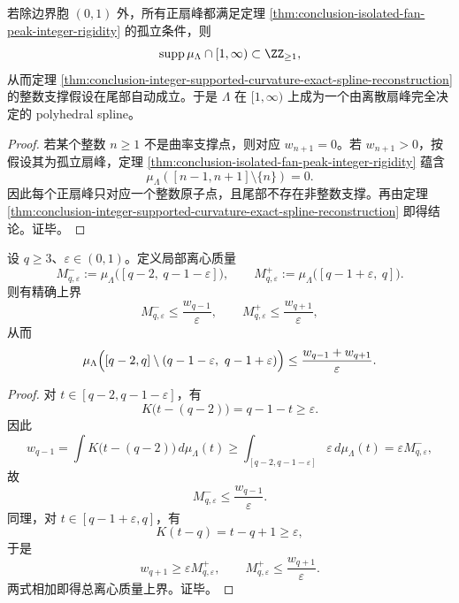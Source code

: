 \begin{corollary}\label{cor:conclusion-isolated-peak-family-global-polyhedral-spline-closure}
若除边界胞 \((0,1)\) 外，所有正扇峰都满足定理 \ref{thm:conclusion-isolated-fan-peak-integer-rigidity} 的孤立条件，则
\[
\operatorname{supp}\mu_\Lambda\cap[1,\infty)\subset \ZZ_{\ge 1},
\]
从而定理 \ref{thm:conclusion-integer-supported-curvature-exact-spline-reconstruction} 的整数支撑假设在尾部自动成立。于是 \(\Lambda\) 在 \([1,\infty)\) 上成为一个由离散扇峰完全决定的 polyhedral spline。
\end{corollary}
\begin{proof}
若某个整数 \(n\ge 1\) 不是曲率支撑点，则对应 \(w_{n+1}=0\)。若 \(w_{n+1}>0\)，按假设其为孤立扇峰，定理 \ref{thm:conclusion-isolated-fan-peak-integer-rigidity} 蕴含
\[
\mu_\Lambda([n-1,n+1]\setminus\{n\})=0.
\]
因此每个正扇峰只对应一个整数原子点，且尾部不存在非整数支撑。再由定理 \ref{thm:conclusion-integer-supported-curvature-exact-spline-reconstruction} 即得结论。证毕。
\end{proof}

\begin{theorem}[近孤立扇峰的定量局部化]\label{thm:conclusion-near-isolated-fan-peak-quantitative-localization}
设 \(q\ge 3\)、\(\varepsilon\in(0,1)\)。定义局部离心质量
\[
M^-_{q,\varepsilon}:=
\mu_\Lambda\bigl([q-2,\ q-1-\varepsilon]\bigr),
\qquad
M^+_{q,\varepsilon}:=
\mu_\Lambda\bigl([q-1+\varepsilon,\ q]\bigr).
\]
则有精确上界
\[
M^-_{q,\varepsilon}\le \frac{w_{q-1}}{\varepsilon},
\qquad
M^+_{q,\varepsilon}\le \frac{w_{q+1}}{\varepsilon},
\]
从而
\[
\mu_\Lambda\Bigl([q-2,q]\setminus(q-1-\varepsilon,\ q-1+\varepsilon)\Bigr)
\le
\frac{w_{q-1}+w_{q+1}}{\varepsilon}.
\]
\end{theorem}
\begin{proof}
对 \(t\in[q-2,q-1-\varepsilon]\)，有
\[
K\bigl(t-(q-2)\bigr)=q-1-t\ge \varepsilon.
\]
因此
\[
w_{q-1}
=
\int K\bigl(t-(q-2)\bigr)\,d\mu_\Lambda(t)
\ge
\int_{[q-2,q-1-\varepsilon]}\varepsilon\,d\mu_\Lambda(t)
=
\varepsilon M^-_{q,\varepsilon},
\]
故
\[
M^-_{q,\varepsilon}\le \frac{w_{q-1}}{\varepsilon}.
\]
同理，对 \(t\in[q-1+\varepsilon,q]\)，有
\[
K(t-q)=t-q+1\ge \varepsilon,
\]
于是
\[
w_{q+1}\ge \varepsilon M^+_{q,\varepsilon},
\qquad
M^+_{q,\varepsilon}\le \frac{w_{q+1}}{\varepsilon}.
\]
两式相加即得总离心质量上界。证毕。
\end{proof}

